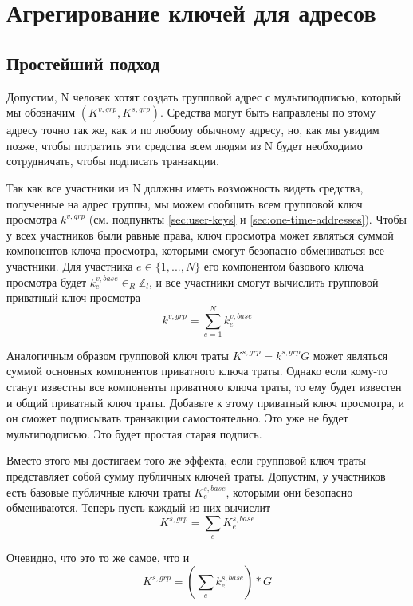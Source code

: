 \section{Агрегирование ключей для адресов}
\label{sec:key-aggregation}

\subsection{Простейший подход}
\label{sec:naive-key-aggregation}

Допустим, N человек хотят создать групповой адрес с мультиподписью, который мы обозна\-чим $(K^{v,grp},K^{s,grp})$. Средства могут быть направлены по этому адресу точно так же, как и по любому обычному адресу, но, как мы увидим позже, чтобы потратить эти средства всем людям из N будет необходимо сотрудничать, чтобы подписать транзакции.

Так как все участники из N должны иметь возможность видеть средства, полученные на адрес группы, мы можем сообщить всем групповой ключ просмотра $k^{v,grp}$ (см. подпункты \ref{sec:user-keys} и \ref{sec:one-time-addresses}). Чтобы у всех участников были равные права, ключ просмотра может являться суммой компонентов ключа просмотра, которыми смогут безопасно обмениваться все участники. Для участника $e \in \{1,...,N\}$ его компонентом базового ключа просмотра будет $k^{v,base}_e \in_R \mathbb{Z}_l$, и все участники смогут вычислить групповой приватный ключ просмотра
\[k^{v,grp} = \sum^{N}_{e=1} k^{v,base}_e\]

Аналогичным образом групповой ключ траты $K^{s,grp} = k^{s,grp} G$ может являться суммой основ\-ных компонентов приватного ключа траты. Однако если кому-то станут известны все компо\-ненты приватного ключа траты, то ему будет известен и общий приватный ключ траты. Добавьте к этому приватный ключ просмотра, и он сможет подписывать транзакции само\-стоятельно. Это уже не будет мультиподписью. Это будет простая старая подпись.

Вместо этого мы достигаем того же эффекта, если групповой ключ траты представляет собой сумму публичных ключей траты. Допустим, у участников есть базовые публичные ключи траты $K^{s,base}_e$, которыми они безопасно обмениваются. Теперь пусть каждый из них вычислит
\[K^{s,grp} = \sum_e K^{s,base}_e\]

Очевидно, что это то же самое, что и
\[K^{s,grp} = (\sum_e k^{s,base}_e)*G\]


